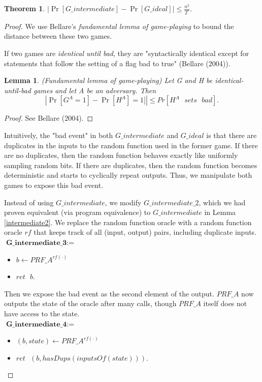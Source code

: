 \documentclass[12pt,lot, lof]{puthesis}
\newenvironment{game}
{ \begin{itemize}[noitemsep,nolistsep] 
}
{ \end{itemize}                  }
\newcommand{\s} {\textrm{ }}
\newcommand{\f}{\frac}
\newtheorem{thm}{Theorem}
\newtheorem{lem}{Lemma}[thm]
\begin{document}
\begin{thm} $| \Pr[G\_intermediate] - \Pr[G\_ideal]| \leq \f{n^2}{2^c}. $ \end{thm}
\begin{proof} 

We use Bellare's \emph{fundamental lemma of game-playing} to bound the distance between these two games.

If two games are \emph{identical until bad}, they are "syntactically identical except for statements that follow the setting of a flag bad to true" (Bellare (2004)).

\begin{lem}(Fundamental lemma of game-playing) Let G and H be identical-until-bad games and
let A be an adversary. Then 
$$|\Pr[G^A = 1] - \Pr[H^A] = 1]| \leq Pr[H^A \s sets \s bad].$$ \end{lem} 
\begin{proof} See Bellare (2004). \end{proof}

Intuitively, the "bad event" in both $G\_intermediate$ and $G\_ideal$ is that there are duplicates in the inputs to the random function used in the former game. If there are no duplicates, then the random function behaves exactly like uniformly sampling random bits. If there are duplicates, then the random function becomes deterministic and starts to cyclically repeat outputs. Thus, we manipulate both games to expose this bad event.

Instead of using $G\_intermediate$, we modify $G\_intermediate\_2$, which we had proven equivalent (via program equivalence) to $G\_intermediate$ in Lemma \ref{intermediate2}. We replace the random function oracle with a random function oracle $rf$ that keeps track of all (input, output) pairs, including duplicate inputs. \\

$\textbf{G\_intermediate\_3} := $
\begin{game}
\item[] $b \leftarrow PRF\_A^{rf(\cdot)}$ 
\item[] $ret \s b.$ \\
\end{game}

Then we expose the bad event as the second element of the output. $PRF\_A$ now outputs the state of the oracle after many calls, though $PRF\_A$ itself does not have access to the state. \\

$\textbf{G\_intermediate\_4} := $
\begin{game}
\item[] $(b, state) \leftarrow PRF\_A^{rf(\cdot)}$ 
\item[] $ret \s (b, hasDups(inputsOf(state))).$ \\
\end{game}


\end{proof}
\end{document}
